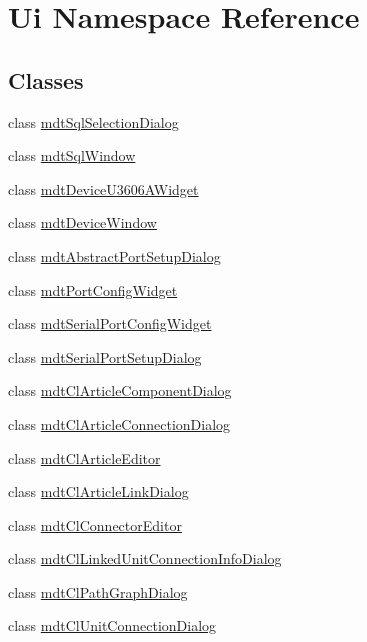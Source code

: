 \hypertarget{namespace_ui}{\section{Ui Namespace Reference}
\label{namespace_ui}
}
\subsection*{Classes}
\begin{DoxyCompactItemize}
\item 
class \hyperlink{class_ui_1_1mdt_sql_selection_dialog}{mdt\-Sql\-Selection\-Dialog}
\item 
class \hyperlink{class_ui_1_1mdt_sql_window}{mdt\-Sql\-Window}
\item 
class \hyperlink{class_ui_1_1mdt_device_u3606_a_widget}{mdt\-Device\-U3606\-A\-Widget}
\item 
class \hyperlink{class_ui_1_1mdt_device_window}{mdt\-Device\-Window}
\item 
class \hyperlink{class_ui_1_1mdt_abstract_port_setup_dialog}{mdt\-Abstract\-Port\-Setup\-Dialog}
\item 
class \hyperlink{class_ui_1_1mdt_port_config_widget}{mdt\-Port\-Config\-Widget}
\item 
class \hyperlink{class_ui_1_1mdt_serial_port_config_widget}{mdt\-Serial\-Port\-Config\-Widget}
\item 
class \hyperlink{class_ui_1_1mdt_serial_port_setup_dialog}{mdt\-Serial\-Port\-Setup\-Dialog}
\item 
class \hyperlink{class_ui_1_1mdt_cl_article_component_dialog}{mdt\-Cl\-Article\-Component\-Dialog}
\item 
class \hyperlink{class_ui_1_1mdt_cl_article_connection_dialog}{mdt\-Cl\-Article\-Connection\-Dialog}
\item 
class \hyperlink{class_ui_1_1mdt_cl_article_editor}{mdt\-Cl\-Article\-Editor}
\item 
class \hyperlink{class_ui_1_1mdt_cl_article_link_dialog}{mdt\-Cl\-Article\-Link\-Dialog}
\item 
class \hyperlink{class_ui_1_1mdt_cl_connector_editor}{mdt\-Cl\-Connector\-Editor}
\item 
class \hyperlink{class_ui_1_1mdt_cl_linked_unit_connection_info_dialog}{mdt\-Cl\-Linked\-Unit\-Connection\-Info\-Dialog}
\item 
class \hyperlink{class_ui_1_1mdt_cl_path_graph_dialog}{mdt\-Cl\-Path\-Graph\-Dialog}
\item 
class \hyperlink{class_ui_1_1mdt_cl_unit_connection_dialog}{mdt\-Cl\-Unit\-Connection\-Dialog}

\end{DoxyCompactItemize}
